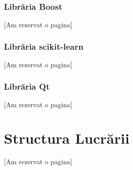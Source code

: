 



\subsubsection{Librăria Boost}
[Am rezervat o pagina]
\pagebreak


\subsubsection{Librăria scikit-learn}
[Am rezervat o pagina]
\pagebreak


\subsubsection{Librăria Qt}
[Am rezervat o pagina]
\pagebreak

\section{Structura Lucrării}
[Am rezervat o pagina]
\pagebreak